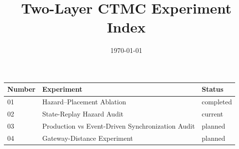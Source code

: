 \documentclass[11pt]{article}
\title{Two-Layer CTMC Experiment Index}
\date{\today}
\begin{document}
\maketitle
\begin{tabular}{lll}
\toprule
Number & Experiment & Status \\
\midrule
01 & Hazard--Placement Ablation & completed \\
02 & State-Replay Hazard Audit & current \\
03 & Production vs Event-Driven Synchronization Audit & planned \\
04 & Gateway-Distance Experiment & planned \\
\bottomrule
\end{tabular}
\end{document}
